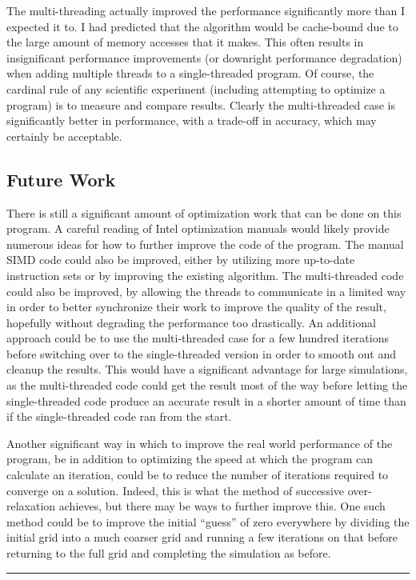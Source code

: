 The multi-threading actually improved the performance significantly more than I expected it to.
I had predicted that the algorithm would be cache-bound due to the large amount of memory accesses
that it makes. This often results in insignificant performance improvements (or downright performance
degradation) when adding multiple threads to a single-threaded program. Of course, the cardinal
rule of any scientific experiment (including attempting to optimize a program) is to measure and
compare results. Clearly the multi-threaded case is significantly better in performance, with a trade-off
in accuracy, which may certainly be acceptable.

\subsection{Future Work}

There is still a significant amount of optimization work that can be done on this program. A careful reading
of Intel optimization manuals would likely provide numerous ideas for how to further improve the code
of the program. The manual SIMD code could also be improved, either by utilizing more up-to-date instruction
sets or by improving the existing algorithm. The multi-threaded code could also be improved, by allowing the threads
to communicate in a limited way in order to better synchronize their work to improve the quality of the result, hopefully without
degrading the performance too drastically. An additional approach could be to use the multi-threaded case for
a few hundred iterations before switching over to the single-threaded version in order to smooth out and cleanup the
results. This would have a significant advantage for large simulations, as the multi-threaded code could get the result
most of the way before letting the single-threaded code produce an accurate result in a shorter amount of time than
if the single-threaded code ran from the start.

Another significant way in which to improve the real world performance of the program, be in addition to optimizing
the speed at which the program can calculate an iteration, could be to reduce the number of iterations required to
converge on a solution. Indeed, this is what the method of successive over-relaxation achieves, but there may be ways
to further improve this. One such method could be to improve the initial ``guess'' of zero everywhere by dividing
the initial grid into a much coarser grid and running a few iterations on that before returning to the full grid and completing
the simulation as before.

\begin{center}\rule{2cm}{0.4pt}\end{center}

